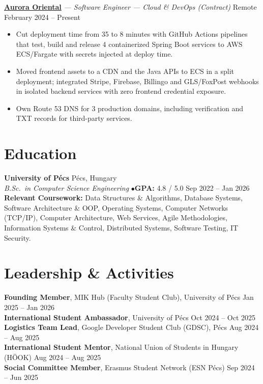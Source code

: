 \documentclass[10pt,a4paper]{article}
\newcommand{\role}[4]{%
    \noindent\textbf{#1} \textit{--- #2} \hfill \textcolor{primary!80}{#3} \\
    \textcolor{accent}{#4}\vspace{1pt}
}
\begin{document}
\role{\href{https://auroraoriental.io}{Aurora Oriental}}{Software Engineer --- Cloud \& DevOps (Contract)}{Remote}{February 2024 -- Present}
\begin{itemize}
    \item Cut deployment time from 35 to 8 minutes with GitHub Actions pipelines that test, build and release 4 containerized Spring Boot services to AWS ECS/Fargate with secrets injected at deploy time.
    \item Moved frontend assets to a CDN and the Java APIs to ECS in a split deployment; integrated Stripe, Firebase, Billingo and GLS/FoxPost webhooks in isolated backend services with zero frontend credential exposure.
    \item Own Route 53 DNS for 3 production domains, including verification and TXT records for third-party services.
\end{itemize}

\section*{Education}
\small
\noindent\textbf{University of Pécs} \hfill \textcolor{primary!80}{Pécs, Hungary} \\
\textit{B.Sc.\ in Computer Science Engineering} \enspace$\bullet$\enspace \textbf{GPA:} 4.8 / 5.0 \hfill \textcolor{accent}{Sep 2022 -- Jan 2026} \\
\textbf{Relevant Coursework:} Data Structures \& Algorithms, Database Systems, Software Architecture \& OOP, Operating Systems, Computer Networks (TCP/IP), Computer Architecture, Web Services, Agile Methodologies, Information Systems \& Control, Distributed Systems, Software Testing, IT Security.

\section*{Leadership \& Activities}
\small
\textbf{Founding Member}, MIK Hub (Faculty Student Club), University of Pécs \hfill Jan 2025 -- Jan 2026 \\
\textbf{International Student Ambassador}, University of Pécs \hfill Oct 2024 -- Oct 2025 \\
\textbf{Logistics Team Lead}, Google Developer Student Club (GDSC), Pécs \hfill Aug 2024 -- Aug 2025 \\
\textbf{International Student Mentor}, National Union of Students in Hungary (HÖOK) \hfill Aug 2024 -- Aug 2025 \\
\textbf{Social Committee Member}, Erasmus Student Network (ESN Pécs) \hfill Sep 2024 -- Jun 2025
\end{document}
